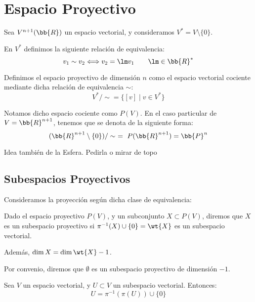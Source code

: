 \chapter{Espacio Proyectivo}

Sea $V^{n+1}(\bb{R})$ un espacio vectorial, y consideramos $V^\ast = V\setminus \{0\}$.

En $V^\ast$ definimos la siguiente relación de equivalencia:
\begin{equation*}
    v_1 \sim v_2 \Longleftrightarrow v_2=\lm v_1 \qquad \lm \in \bb{R}^\ast
\end{equation*}

Definimos el espacio proyectivo de dimensión $n$ como el espacio vectorial cociente mediante dicha relación de equivalencia $\sim$:
\begin{equation*}
    V^\ast/\sim = \{[v]\mid v\in V^\ast\}
\end{equation*}

Notamos dicho espacio cociente como $P(V)$. En el caso particular de $V=\bb{R}^{n+1}$, tenemos que se denota de la siguiente forma:
\begin{equation*}
    (\bb{R}^{n+1}\setminus \{0\})/\sim ~=~ P(\bb{R}^{n+1})=\bb{P}^n
\end{equation*}


Idea también de la Esfera. Pedirla o mirar de topo


\section{Subespacios Proyectivos}

Consideramos la proyección según dicha clase de equivalencia:

\begin{definicion}
    Dado el espacio proyectivo $P(V)$, y un subconjunto $X\subset P(V)$, diremos que $X$ es un subespacio proyectivo si $\pi^{-1}(X)\cup \{0\}=\wt{X}$ es un subespacio vectorial.

    Además, $\dim X = \dim \wt{X}-1$.

    Por convenio, diremos que $\emptyset$ es un subespacio proyectivo de dimensión $-1$.
\end{definicion}

\begin{prop}
    Sea $V$ un espacio vectorial, y $U\subset V$ un subespacio vectorial. Entonces:
    \begin{equation*}
        U = \pi^{-1}(\pi(U))\cup \{0\}
    \end{equation*}
\end{prop}


